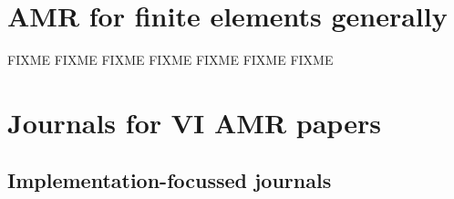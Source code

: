 \documentclass[11pt]{article}
\begin{document}
\section{AMR for finite elements generally}

\begin{itemize}
  FIXME
 FIXME
  FIXME
 FIXME
  FIXME
 FIXME
 FIXME
\end{itemize}


{\small


}


\appendix
\section{Journals for VI AMR papers}

\subsection*{Implementation-focussed journals}
\end{document}
